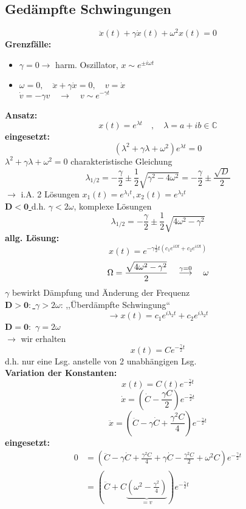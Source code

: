 \documentclass[titlepage,12pt,a4paper,ngerman]{report}
\begin{document}
\subsection{Gedämpfte Schwingungen}
$$\ddot{x}(t) + \gamma \dot{x}(t) + \omega^2 x(t) = 0 $$
\textbf{Grenzfälle:}
\begin{itemize}
	\item $ \gamma = 0 \rightarrow$ harm. Oszillator, $x \sim e^{\pm i \omega t}$
	\item $\omega = 0, \quad \ddot{x} + \gamma\dot{x} = 0, \quad v= \dot{x}$\\
	$\dot{v} = -\gamma v \quad \rightarrow \quad v \sim e^{-\gamma t}$
\end{itemize}
\textbf{Ansatz:} $$x(t) = e^{\lambda t} \quad , \quad \lambda = a+ ib \in \mathbb{C}$$
\textbf{eingesetzt:} $$(\lambda^2 + \gamma\lambda + \omega^2) e^{\lambda t} = 0$$
$\lambda^2 + \gamma \lambda + \omega^2 = 0 $ charakteristische Gleichung
$$\lambda_{1/2} = - \frac{\gamma}{2} \pm \frac{1}{2} \sqrt{\gamma^2 - 4\omega^2} = -\frac{\gamma}{2} \pm \frac{\sqrt{D}}{2}$$
$\rightarrow$ i.A. 2 Lösungen $x_1 (t) = e^{\lambda_1 t}, x_2(t) = e^{\lambda_2 t}$\\
\underline{$\mathbf{D<0}$ }
d.h. $\gamma < 2 \omega$, komplexe Lösungen
$$\lambda_{1/2} = - \frac{\gamma}{2} \pm \frac{1}{2} \sqrt{ 4\omega^2 - \gamma^2}$$
\textbf{allg. Lösung:}
$$x(t) = e^{-\gamma \frac{1}{2} t (c_1 e^{i\Omega t} + c_2 e ^{i \Omega t})}$$
$$\Omega = \frac{\sqrt{4 \omega^2 - \gamma ^2}}{2} \quad \buildrel \gamma = 0 \over \longrightarrow \quad \omega$$
$\gamma$ bewirkt Dämpfung und Änderung der Frequenz\\[10pt]
\underline{$\mathbf{D>0:}$ }
$\gamma > 2\omega$: ,,Überdämpfte Schwingung``
$$\rightarrow x(t) = c_1 e^{i\lambda_2 t} + c_2 e ^{i \lambda_2 t}$$
\underline{$\mathbf{D = 0:}$}
$\gamma = 2 \omega$\\
$\rightarrow$ wir erhalten 
$$x(t) = C e^{-\frac{\gamma}{2}t}$$
d.h. nur eine Lsg. anstelle von 2 unabhängigen Lsg.\\[10pt]
\textbf{Variation der Konstanten:}
$$x(t) = C(t) e^{- \frac{\gamma}{2}t}$$
$$\dot{x} = (\dot{C} - \frac{\gamma C}{2}) e ^{-\frac{\gamma}{2}t}$$
$$ \ddot{x} = (\ddot{C} - \gamma\dot{C} + \frac{\gamma^2 C }{4}) e ^{-\frac{\gamma}{2}t}$$
\textbf{eingesetzt:}
\begin{align*}
0 & = (\ddot{C} - \gamma \dot{C} + \frac{\gamma^2 C}{4} + \gamma \dot{C} - \frac{\gamma^2 C}{2} + \omega^2 C ) e ^{-\frac{\gamma}{2}t}\\
& = ( \ddot{C} + C\underbrace{(\omega^2 - \frac{\gamma^2}{4})}_{=v} ) e ^{-\frac{\gamma}{2}t}
\end{align*}
\end{document}
